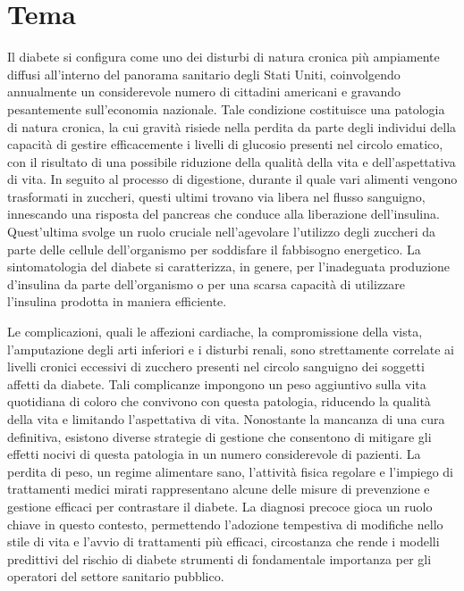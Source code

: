 \section[Tema]{Tema}
Il diabete si configura come uno dei disturbi di natura cronica più ampiamente diffusi all'interno del panorama sanitario degli Stati Uniti, coinvolgendo annualmente un considerevole numero di cittadini americani e gravando pesantemente sull'economia nazionale. 
Tale condizione costituisce una patologia di natura cronica, la cui gravità risiede nella perdita da parte degli individui della capacità di gestire efficacemente i livelli di glucosio presenti nel circolo ematico, con il risultato di una possibile riduzione della qualità della vita e dell'aspettativa di vita.
In seguito al processo di digestione, durante il quale vari alimenti vengono trasformati in zuccheri, questi ultimi trovano via libera nel flusso sanguigno, innescando una risposta del pancreas che conduce alla liberazione dell'insulina.
Quest'ultima svolge un ruolo cruciale nell'agevolare l'utilizzo degli zuccheri da parte delle cellule dell'organismo per soddisfare il fabbisogno energetico. 
La sintomatologia del diabete si caratterizza, in genere, per l'inadeguata produzione d'insulina da parte dell'organismo o per una scarsa capacità di utilizzare l'insulina prodotta in maniera efficiente.

Le complicazioni, quali le affezioni cardiache, la compromissione della vista, l'amputazione degli arti inferiori e i disturbi renali, sono strettamente correlate ai livelli cronici eccessivi di zucchero presenti nel circolo sanguigno dei soggetti affetti da diabete.
Tali complicanze impongono un peso aggiuntivo sulla vita quotidiana di coloro che convivono con questa patologia, riducendo la qualità della vita e limitando l'aspettativa di vita. 
Nonostante la mancanza di una cura definitiva, esistono diverse strategie di gestione che consentono di mitigare gli effetti nocivi di questa patologia in un numero considerevole di pazienti.
La perdita di peso, un regime alimentare sano, l'attività fisica regolare e l'impiego di trattamenti medici mirati rappresentano alcune delle misure di prevenzione e gestione efficaci per contrastare il diabete.
La diagnosi precoce gioca un ruolo chiave in questo contesto, permettendo l'adozione tempestiva di modifiche nello stile di vita e l'avvio di trattamenti più efficaci, circostanza che rende i modelli predittivi del rischio di diabete strumenti di fondamentale importanza per gli operatori del settore sanitario pubblico.

